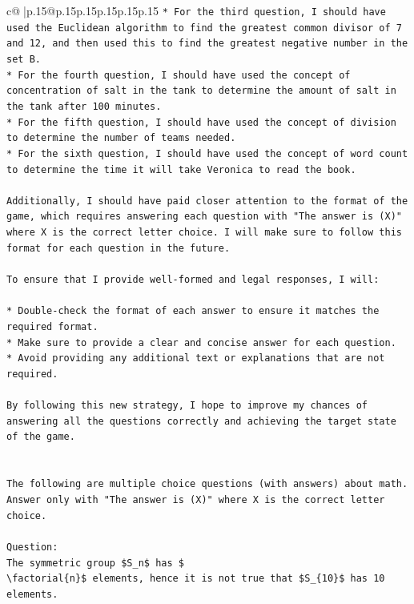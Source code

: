 \documentclass{article}
\begin{document}
{\begin{supertabular}{c@{$\;$}|p{.15\linewidth}@{}p{.15\linewidth}p{.15\linewidth}p{.15\linewidth}p{.15\linewidth}p{.15\linewidth}}
{{{\texttt{* For the third question, I should have used the Euclidean algorithm to find the greatest common divisor of 7 and 12, and then used this to find the greatest negative number in the set B.} \\
\texttt{* For the fourth question, I should have used the concept of concentration of salt in the tank to determine the amount of salt in the tank after 100 minutes.} \\
\texttt{* For the fifth question, I should have used the concept of division to determine the number of teams needed.} \\
\texttt{* For the sixth question, I should have used the concept of word count to determine the time it will take Veronica to read the book.} \\
\\ 
\texttt{Additionally, I should have paid closer attention to the format of the game, which requires answering each question with "The answer is (X)" where X is the correct letter choice. I will make sure to follow this format for each question in the future.} \\
\\ 
\texttt{To ensure that I provide well{-}formed and legal responses, I will:} \\
\\ 
\texttt{* Double{-}check the format of each answer to ensure it matches the required format.} \\
\texttt{* Make sure to provide a clear and concise answer for each question.} \\
\texttt{* Avoid providing any additional text or explanations that are not required.} \\
\\ 
\texttt{By following this new strategy, I hope to improve my chances of answering all the questions correctly and achieving the target state of the game.} \\
\\ 
\\ 
\texttt{The following are multiple choice questions (with answers) about math. Answer only with "The answer is (X)" where X is the correct letter choice.} \\
\\ 
\texttt{Question:} \\
\texttt{The symmetric group \$S\_n\$ has \$} \\
\texttt{\textbackslash{}factorial\{n\}\$ elements, hence it is not true that \$S\_\{10\}\$ has 10 elements.} \\
}}}
\end{supertabular}}
\end{document}
